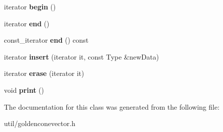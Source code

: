 \begin{DoxyCompactItemize}
\mbox{\label{class_golden_cone_vector_aeb123e6db4c356b66754ee6e2e813935}} 
iterator {\bfseries begin} ()
\item 
\mbox{\label{class_golden_cone_vector_af926598b3e8242f1c7f5241383f3c566}} 
iterator {\bfseries end} ()
\item 
\mbox{\label{class_golden_cone_vector_a7962ba599356afbbfc2e21ac58fceb2b}} 
const\+\_\+iterator {\bfseries end} () const
\item 
\mbox{\label{class_golden_cone_vector_a88d8c250877cea1bbec12ec6419a32d8}} 
iterator {\bfseries insert} (iterator it, const Type \&new\+Data)
\item 
\mbox{\label{class_golden_cone_vector_a27534fb2287d04adae0d1e92aef8f062}} 
iterator {\bfseries erase} (iterator it)
\item 
\mbox{\label{class_golden_cone_vector_af98335cbce7c8680a3e45e5095443974}} 
void {\bfseries print} ()
\end{DoxyCompactItemize}


The documentation for this class was generated from the following file\+:\begin{DoxyCompactItemize}
\item 
util/goldenconevector.\+h\end{DoxyCompactItemize}

